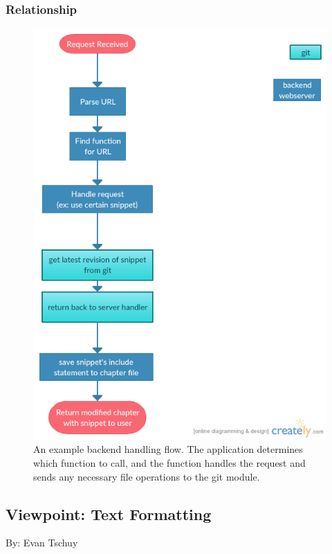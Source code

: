\documentclass[onecolumn, draftclsnofoot,10pt, compsoc]{IEEEtran}
\begin{document}
\subsubsection{Relationship}
\begin{figure}[ht!]
\centering
\includegraphics[scale=0.5]{backend.png}
\caption{An example backend handling flow. The application determines which 
function to call, and the function handles the request and sends any necessary 
file operations to the git module.}
\end{figure}
\pagebreak





\subsection{Viewpoint: Text Formatting}
{\noindent By: Evan Tschuy \par}
\end{document}
